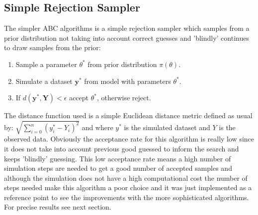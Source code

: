 \documentclass[12pt,a4paper,titlepage]{article}
\begin{document}
\subsection{Simple Rejection Sampler}
The simpler ABC algorithms is a simple rejection sampler\cite{pritchard1999population} which samples from a prior distribution not taking into account correct guesses and 'blindly' continues to draw samples from the prior:
\begin{enumerate}[noitemsep]
\item{Sample a parameter $\theta ^*$ from prior distribution $\pi(\theta)$.}
\item{Simulate a dataset $\mathbf{y}^*$  from model with parameters $\theta ^*$.}
\item{If $d(\mathbf{y}^*, \mathbf{Y}) < \epsilon$ accept $\theta^*$, otherwise reject.}
\end{enumerate}
The distance function used is a simple Euclidean distance metric defined as usual by: $\sqrt{\sum_{i=0}^{n} (y^*_{i} - Y_{i})^2}$ and where $y^*$ is the simulated dataset and $Y$ is the observed data. Obviously the acceptance rate for this algorithm is really low since it does not take into account previous good guessed to inform the search and keeps 'blindly' guessing. This low acceptance rate means a high number of simulation steps are needed to get a good number of accepted samples and although the simulation does not have a high computational cost the number of steps needed make this algorithm a poor choice and it was just implemented as a reference point to see the improvements with the more sophisticated algorithms. For precise results see next section.
\end{document}
